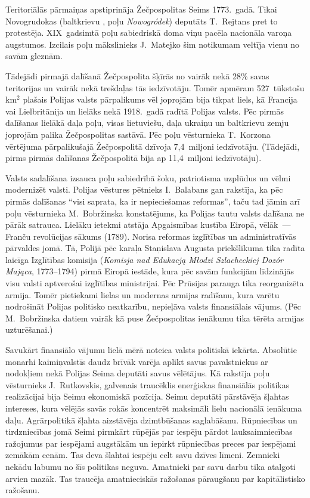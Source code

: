 \documentclass[twoside,a5paper,12pt,fleqn,openany]{extbook}
\newcommand{\pltxti}[1]{\textit{\textpolish{#1}}}
\newcommand{\betxti}[1]{\textbelarusian{#1}}
\begin{document}
Teritoriālās pārmaiņas apstiprināja Žečpospolitas Seims 1773.~gadā. Tikai Novogrudokas (baltkrievu \betxti{Навагрудак}, poļu \pltxti{Nowogródek}) deputāts T.~Rejtans pret to protestēja. XIX~gadsimtā poļu sabiedriskā doma viņu pacēla nacionāla varoņa augstumos. Izcilais poļu mākslinieks J.~Matejko šim notikumam veltīja vienu no savām gleznām.

Tādejādi pirmajā dalīšanā Žečpospolita šķīrās no vairāk nekā 28\% savas teritorijas un vairāk nekā trešdaļas tās iedzīvotāju. Tomēr apmēram 527~tūkstošu km$^{2}$ plašais Polijas valsts pārpalikums vēl joprojām bija tikpat liels, kā Francija vai Lielbritānija un lielāks nekā 1918.~gadā radītā Polijas valsts. Pēc pirmās dalīšanas lielākā daļa poļu, visas lietuviešu, daļa ukraiņu un baltkrievu zemju joprojām palika Žečpospolitas sastāvā. Pēc poļu vēsturnieka T.~Korzona vērtējuma pārpalikušajā Žečpospolitā dzīvoja 7,4~miljoni iedzīvotāju. (Tādejādi, pirms pirmās dalīšanas Žečpospolitā bija ap 11,4~miljoni iedzīvotāju).

Valsts sadalīšana izsauca poļu sabiedrībā šoku, patriotisma uzplūdus un vēlmi modernizēt valsti. Polijas vēstures pētnieks I.~Balabans gan rakstīja, ka pēc pirmās dalīšanas ``visi saprata, ka ir nepieciešamas reformas'', taču tad jāmin arī poļu vēsturnieka M.~Bobržinska konstatējums, ka Polijas tautu valsts dalīšana ne pārāk satrauca. Lielāku ietekmi atstāja Apgaismības kustība Eiropā, vēlāk~--- Franču revolūcijas sākums (1789). Norisa reformas izglītības un administratīvās pārvaldes jomā. Tā, Polijā pēc karaļa Staņislava Augusta priekšlikuma tika radīta laicīga Izglītības komisija (\pltxti{Komisja nad Edukacją Młodzi Szlacheckiej Dozór Mająca}, 1773--1794) pirmā Eiropā iestāde, kura pēc savām funkcijām līdzinājās visu valsti aptverošai izglītības ministrijai. Pēc Prūsijas parauga tika reorganizēta armija. Tomēr pietiekami lielas un modernas armijas radīšanu, kura varētu nodrošināt Polijas politisko neatkarību, nepieļāva valsts finansiālais vājums. (Pēc M.~Bobržinska datiem vairāk kā puse Žečpospolitas ienākumu tika tērēta armijas uzturēšanai.)

Savukārt finansiālo vājumu lielā mērā noteica valsts politiskā iekārta. Absolūtie monarhi kaimiņvalstīs daudz brīvāk varēja aplikt savus pavalstniekus ar nodokļiem nekā Polijas Seima deputāti savus vēlētājus. Kā rakstīja poļu vēsturnieks J.~Rutkovskis, galvenais traucēklis enerģiskas finansiālās politikas realizācijai bija Seimu ekonomiskā pozīcija. Seimu deputāti pārstāvēja šļahtas intereses, kura vēlējās savās rokās koncentrēt maksimāli lielu nacionālā ienākuma daļu. Agrārpolitikā šļahta aizstāvēja dzimtbūšanas saglabāšanu. Rūpniecības un tirdzniecības jomā Seimi pirmkārt rūpējās par iespēju pārdot lauksaimniecības ražojumus par iespējami augstākām un iepirkt rūpniecības preces par iespējami zemākām cenām. Tas deva šļahtai iespēju celt savu dzīves līmeni. Zemnieki nekādu labumu no šīs politikas neguva. Amatnieki par savu darbu tika atalgoti arvien mazāk. Tas traucēja amatnieciskās ražošanas pāraugšanu par kapitālistisko ražošanu.
\end{document}
